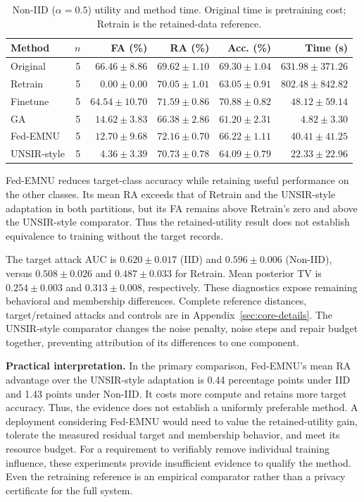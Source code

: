\begin{table}[H]\centering\small
\caption{Non-IID ($\alpha=0.5$) utility and method time. Original time is pretraining cost; Retrain is the retained-data reference.}
\label{tab:noniid-utility}
\begin{tabular}{lrrrrr}\toprule Method & $n$ & FA (\%) & RA (\%) & Acc. (\%) & Time (s)\\\midrule
Original & 5 & $66.46 \pm 8.86$ & $69.62 \pm 1.10$ & $69.30 \pm 1.04$ & $631.98 \pm 371.26$\\
Retrain & 5 & $0.00 \pm 0.00$ & $70.05 \pm 1.01$ & $63.05 \pm 0.91$ & $802.48 \pm 842.82$\\
Finetune & 5 & $64.54 \pm 10.70$ & $71.59 \pm 0.86$ & $70.88 \pm 0.82$ & $48.12 \pm 59.14$\\
GA & 5 & $14.62 \pm 3.83$ & $66.38 \pm 2.86$ & $61.20 \pm 2.31$ & $4.82 \pm 3.30$\\
Fed-EMNU & 5 & $12.70 \pm 9.68$ & $72.16 \pm 0.70$ & $66.22 \pm 1.11$ & $40.41 \pm 41.25$\\
UNSIR-style & 5 & $4.36 \pm 3.39$ & $70.73 \pm 0.78$ & $64.09 \pm 0.79$ & $22.33 \pm 22.96$\\
\bottomrule\end{tabular}\end{table}
Fed-EMNU reduces target-class accuracy while retaining useful performance on
the other classes. Its mean RA exceeds that of Retrain and the UNSIR-style
adaptation in both partitions, but its FA remains above Retrain's zero and
above the UNSIR-style comparator. Thus the retained-utility result does not
establish equivalence to training without the target records.

The target attack AUC is $0.620\pm0.017$ (IID) and $0.596\pm0.006$ (Non-IID),
versus $0.508\pm0.026$ and $0.487\pm0.033$ for Retrain. Mean posterior TV is
$0.254\pm0.003$ and $0.313\pm0.008$, respectively. These diagnostics expose
remaining behavioral and membership differences. Complete reference distances,
target/retained attacks and controls are in Appendix~\ref{sec:core-details}.
The UNSIR-style comparator changes the noise penalty, noise steps and repair
budget together, preventing attribution of its differences to one component.

\textbf{Practical interpretation.} In the primary comparison, Fed-EMNU's mean
RA advantage over the UNSIR-style adaptation is 0.44 percentage points under
IID and 1.43 points under Non-IID. It costs more compute and retains more target
accuracy. Thus, the evidence does not establish a uniformly preferable method.
A deployment considering Fed-EMNU would need to value the retained-utility
gain, tolerate the measured residual target and membership behavior, and meet
its resource budget. For a requirement to verifiably remove individual training
influence, these experiments provide insufficient evidence to qualify the
method. Even the retraining reference is an empirical comparator rather than
a privacy certificate for the full system.

